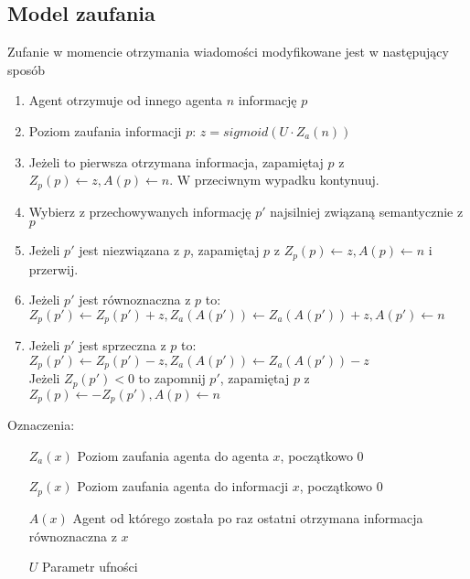\documentclass{article}
\begin{document}
	\subsection{Model zaufania}
	Zufanie w momencie otrzymania wiadomości modyfikowane jest w następujący sposób
	\begin{enumerate}
		\item Agent otrzymuje od innego agenta $n$ informację $p$
		\item Poziom zaufania informacji $p$: $ z = sigmoid(U \cdot Z_a(n)) $
		\item Jeżeli to pierwsza otrzymana informacja,
		zapamiętaj $p$ z $ Z_p(p) \leftarrow z, A(p) \leftarrow n $.
		W przeciwnym wypadku kontynuuj.
		\item Wybierz z przechowywanych informację $p'$ najsilniej związaną semantycznie z $p$
		\item Jeżeli $p'$ jest niezwiązana z $p$, zapamiętaj $p$ z $ Z_p(p) \leftarrow z, A(p) \leftarrow n $ i przerwij.
		\item Jeżeli $p'$ jest równoznaczna z $p$ to:\\
		$ Z_p(p') \leftarrow Z_p(p') + z, Z_a(A(p')) \leftarrow Z_a(A(p')) + z , A(p') \leftarrow n $
		\item Jeżeli $p'$ jest sprzeczna z $p$ to:\\
		$ Z_p(p') \leftarrow Z_p(p') - z, Z_a(A(p')) \leftarrow Z_a(A(p')) - z$\\
		Jeżeli $ Z_p(p') < 0 $ to zapomnij $p'$, zapamiętaj $p$ z\\
		$ Z_p(p) \leftarrow -Z_p(p'), A(p) \leftarrow n $
	\end{enumerate}
	Oznaczenia:
	\begin{itemize}
		\item[$Z_a(x)$] Poziom zaufania agenta do agenta $x$, początkowo $0$
		\item[$Z_p(x)$] Poziom zaufania agenta do informacji $x$, początkowo $0$
		\item[$A(x)$] Agent od którego została po raz ostatni otrzymana informacja równoznaczna z $x$
		
		\item[$U$] Parametr ufności
			
	\end{itemize}
\end{document}
